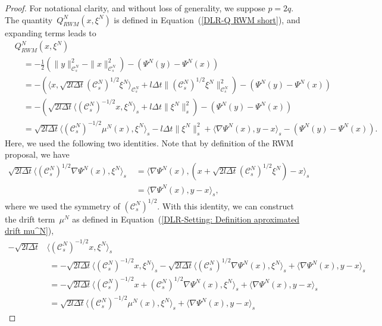 \begin{proof}
 For notational clarity, and without loss of generality, we suppose $p=2q$. The quantity~$Q^N_{RWM} (x,  \xi^N)$ is defined in Equation~(\ref{DLR-Q RWM short}), and expanding terms leads to
\begin{align*}
 &  Q^N_{RWM} (x,  \xi^N) \\
  & \quad = - \frac{1}{2} (\|y\|_{\mathcal{C}^N_s}^2 - \|x\|_{\mathcal{C}^N_s}^2) - (\Psi^N(y) - \Psi^N(x)) \\
  & \quad = -  \left( \langle x, \sqrt{2l \Delta t} (\mathcal{C}^N_s)^{1/2} \xi^N \rangle_{\mathcal{C}^N_s} + l \Delta t \|(\mathcal{C}^N_s)^{1/2} \xi^N\|_{\mathcal{C}^N_s}^2 \right) - (\Psi^N(y) - \Psi^N(x)) \\
  & \quad = -  \left( \sqrt{2l \Delta t} \langle (\mathcal{C}^N_s)^{-1/2} x,   \xi^N \rangle_{s} + l \Delta t \| \xi^N\|_{s}^2 \right) - (\Psi^N(y) - \Psi^N(x)) \\
  & \quad =\sqrt{2l \Delta t} \langle (\mathcal{C}^N_s)^{-1/2} \mu^N(x) , \xi^N \rangle_s  - l \Delta t \| \xi^N\|_{s}^2 + \langle \nabla \Psi^N(x), y - x\rangle_s  - (\Psi^N(y) - \Psi^N(x)).
\end{align*}
Here, we used the following two identities. Note that by definition of the RWM proposal, we have
\begin{align*}
 \sqrt{2l \Delta t} \langle (\mathcal{C}^N_s)^{1/2} \nabla \Psi^N(x), \xi^N \rangle_s & \; = \langle  \nabla \Psi^N(x), ( x + \sqrt{2l \Delta t}  (\mathcal{C}^N_s)^{1/2} \xi^N )  -x \rangle_s \\
 & \; = \langle \nabla \Psi^N(x) , y - x \rangle_s,
\end{align*}
where we used the symmetry of $(\mathcal{C}^N_s)^{1/2}$. With this identity, we can construct the drift term~$\mu^N$ as defined in Equation~(\ref{DLR-Setting: Definition aproximated drift mu^N}),
\begin{align*}
 - \sqrt{2l \Delta t} & \langle  (\mathcal{C}^N_s)^{-1/2} x, \xi^N \rangle_s \\
 & \; = - \sqrt{2l \Delta t} \langle (\mathcal{C}^N_s)^{-1/2} x, \xi^N \rangle_s - \sqrt{2l \Delta t} \langle (\mathcal{C}^N_s)^{1/2} \nabla \Psi^N(x), \xi^N \rangle_s  + \langle \nabla \Psi^N(x), y - x\rangle_s \\
 & \; = - \sqrt{2l \Delta t} \langle (\mathcal{C}^N_s)^{-1/2} x + (\mathcal{C}^N_s)^{1/2} \nabla \Psi^N(x) , \xi^N \rangle_s  + \langle \nabla \Psi^N(x), y - x\rangle_s \\
 & \; =  \sqrt{2l \Delta t} \langle (\mathcal{C}^N_s)^{-1/2} \mu^N(x) , \xi^N \rangle_s  + \langle \nabla \Psi^N(x), y - x\rangle_s

\end{align*}
\end{proof}
